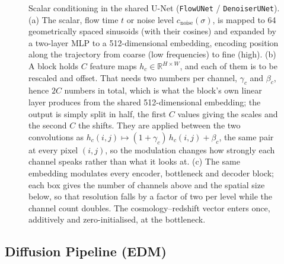 \documentclass{report}
\begin{document}
\begin{figure}[h!]
{}
\caption{Scalar conditioning in the shared U-Net (\texttt{FlowUNet} / \texttt{DenoiserUNet}).
(a) The scalar, flow time \mbox{$t$} or noise level \mbox{$c_{\mathrm{noise}}(\sigma)$}, is mapped to 64
geometrically spaced sinusoids (with their cosines) and expanded by a two-layer MLP to a
512-dimensional embedding, encoding position along the trajectory from coarse (low
frequencies) to fine (high). (b) A block holds \mbox{$C$} feature maps \mbox{$h_c \in \mathbb{R}^{H \times W}$}, and each of them is to be
rescaled and offset. That needs two numbers per channel, \mbox{$\gamma_c$} and \mbox{$\beta_c$}, hence \mbox{$2C$}
numbers in total, which is what the block's own linear layer produces from the shared
512-dimensional embedding; the output is simply split in half, the first \mbox{$C$} values giving the
scales and the second \mbox{$C$} the shifts. They are applied between the two convolutions as
$h_c(i,j)\mapsto(1+\gamma_c)\,h_c(i,j)+\beta_c$, the same pair at every pixel $(i,j)$, so the
modulation changes how strongly each channel speaks rather than what it looks at. (c) The same
embedding modulates every encoder, bottleneck and decoder block; each box gives the number of
channels above and the spatial size below, so that resolution falls by a factor of two per level
while the channel count doubles. The cosmology--redshift vector enters once, additively and
zero-initialised, at the bottleneck.}

\label{fig:film_unet}
\end{figure}

\subsection{Diffusion Pipeline (EDM)}
\label{subsec:pipe-diffusion}
\end{document}
